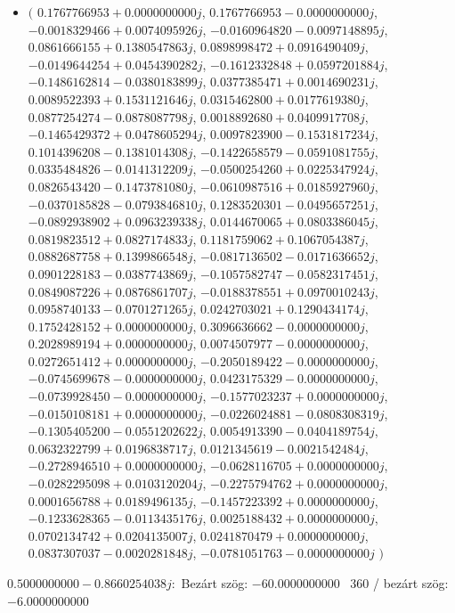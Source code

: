 \documentclass[14pt,a4paper]{article}
\begin{document}
\begin{itemize}
\item
$\big($
$0.1767766953+0.0000000000j$, $0.1767766953-0.0000000000j$, $-0.0018329466+0.0074095926j$, $-0.0160964820-0.0097148895j$, $0.0861666155+0.1380547863j$, $0.0898998472+0.0916490409j$, $-0.0149644254+0.0454390282j$, $-0.1612332848+0.0597201884j$, $-0.1486162814-0.0380183899j$, $0.0377385471+0.0014690231j$, $0.0089522393+0.1531121646j$, $0.0315462800+0.0177619380j$, $0.0877254274-0.0878087798j$, $0.0018892680+0.0409917708j$, $-0.1465429372+0.0478605294j$, $0.0097823900-0.1531817234j$, $0.1014396208-0.1381014308j$, $-0.1422658579-0.0591081755j$, $0.0335484826-0.0141312209j$, $-0.0500254260+0.0225347924j$, $0.0826543420-0.1473781080j$, $-0.0610987516+0.0185927960j$, $-0.0370185828-0.0793846810j$, $0.1283520301-0.0495657251j$, $-0.0892938902+0.0963239338j$, $0.0144670065+0.0803386045j$, $0.0819823512+0.0827174833j$, $0.1181759062+0.1067054387j$, $0.0882687758+0.1399866548j$, $-0.0817136502-0.0171636652j$, $0.0901228183-0.0387743869j$, $-0.1057582747-0.0582317451j$, $0.0849087226+0.0876861707j$, $-0.0188378551+0.0970010243j$, $0.0958740133-0.0701271265j$, $0.0242703021+0.1290434174j$, $0.1752428152+0.0000000000j$, $0.3096636662-0.0000000000j$, $0.2028989194+0.0000000000j$, $0.0074507977-0.0000000000j$, $0.0272651412+0.0000000000j$, $-0.2050189422-0.0000000000j$, $-0.0745699678-0.0000000000j$, $0.0423175329-0.0000000000j$, $-0.0739928450-0.0000000000j$, $-0.1577023237+0.0000000000j$, $-0.0150108181+0.0000000000j$, $-0.0226024881-0.0808308319j$, $-0.1305405200-0.0551202622j$, $0.0054913390-0.0404189754j$, $0.0632322799+0.0196838717j$, $0.0121345619-0.0021542484j$, $-0.2728946510+0.0000000000j$, $-0.0628116705+0.0000000000j$, $-0.0282295098+0.0103120204j$, $-0.2275794762+0.0000000000j$, $0.0001656788+0.0189496135j$, $-0.1457223392+0.0000000000j$, $-0.1233628365-0.0113435176j$, $0.0025188432+0.0000000000j$, $0.0702134742+0.0204135007j$, $0.0241870479+0.0000000000j$, $0.0837307037-0.0020281848j$, $-0.0781051763-0.0000000000j$
$\big)$
\end{itemize}
$0.5000000000-0.8660254038j$:\
Bezárt szög: $-60.0000000000$ \
360 / bezárt szög: $-6.0000000000$\
\end{document}

